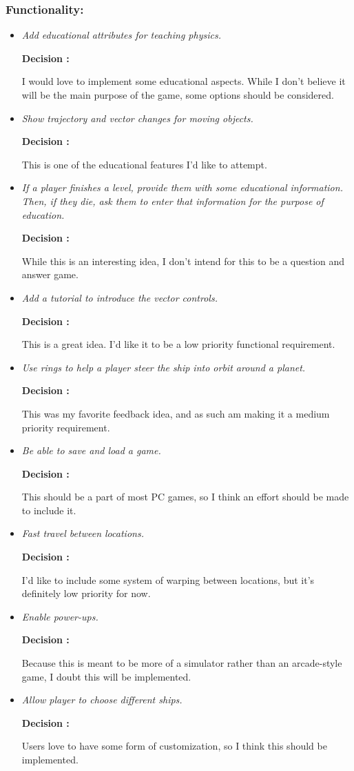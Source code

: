 \subsubsection*{Functionality:}
\begin{itemize}
  \item \emph{Add educational attributes for teaching physics.}

        \textbf{Decision : } \parbox[t]{5in}{I would love to implement some educational aspects. While I don't believe it will be the main purpose of the game, some options should be considered.}

  \item \emph{Show trajectory and vector changes for moving objects.}

        \textbf{Decision : } \parbox[t]{5in}{This is one of the educational features I'd like to attempt.}

  \item \emph{If a player finishes a level, provide them with some educational information. Then, if they die, ask them to enter that information for the purpose of education.}

        \textbf{Decision : } \parbox[t]{5in}{While this is an interesting idea, I don't intend for this to be a question and answer game.}

  \item \emph{Add a tutorial to introduce the vector controls.}

        \textbf{Decision : } \parbox[t]{5in}{This is a great idea. I'd like it to be a low priority functional requirement.}

  \item \emph{Use rings to help a player steer the ship into orbit around a planet.}

        \textbf{Decision : } \parbox[t]{5in}{This was my favorite feedback idea, and as such am making it a medium priority requirement.}

  \item \emph{Be able to save and load a game.}

        \textbf{Decision : } \parbox[t]{5in}{This should be a part of most PC games, so I think an effort should be made to include it.}

  \item \emph{Fast travel between locations.}

        \textbf{Decision : } \parbox[t]{5in}{I'd like to include some system of warping between locations, but it's definitely low priority for now.}

  \item \emph{Enable power-ups.}

        \textbf{Decision : } \parbox[t]{5in}{Because this is meant to be more of a simulator rather than an arcade-style game, I doubt this will be implemented.}

  \item \emph{Allow player to choose different ships.}

        \textbf{Decision : } \parbox[t]{5in}{Users love to have some form of customization, so I think this should be implemented.}
\end{itemize}

